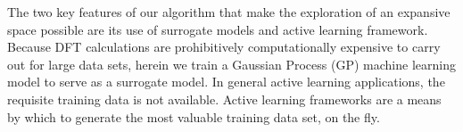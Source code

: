The two key features of our algorithm that make the exploration of an expansive space possible are its use of surrogate models and active learning framework.
%
Because DFT calculations are prohibitively computationally expensive to carry out for large data sets, herein we train a Gaussian Process (GP) machine learning model to serve as a surrogate model.
%
In general active learning applications, the requisite training data is not available.
%
Active learning frameworks are a means by which to generate the most valuable training data set, on the fly.




